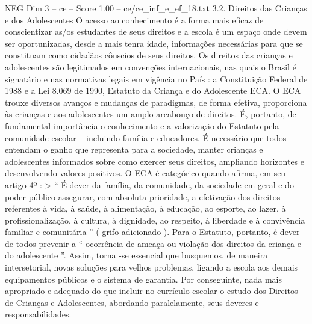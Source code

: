 \begin{textsample}{NEG Dim 3 – ce – Score 1.00 – ce/ce\_inf\_e\_ef\_18.txt}  \label{ex:f3_neg_238}
3.2.
Direitos das Crianças e dos Adolescentes O acesso ao conhecimento é a forma mais eficaz de conscientizar as/os estudantes de seus direitos e a escola é um espaço onde devem ser oportunizadas, desde a mais tenra idade, informações necessárias para que se constituam como cidadãos cônscios de seus direitos.
Os direitos das crianças e adolescentes são legitimados em convenções internacionais, nas quais o Brasil é signatário e nas normativas legais em vigência no País : a Constituição Federal de 1988 e a Lei 8.069 de 1990, Estatuto da Criança e do Adolescente ECA.
O ECA trouxe diversos avanços e mudanças de paradigmas, de forma efetiva, proporciona às crianças e aos adolescentes um amplo arcabouço de direitos.
É, portanto, de fundamental importância o conhecimento e a valorização do Estatuto pela comunidade escolar – incluindo família e educadores.
É necessário que todos entendam o ganho que representa para a sociedade, manter crianças e adolescentes informados sobre como exercer seus direitos, ampliando horizontes e desenvolvendo valores positivos.
O ECA é categórico quando afirma, em seu artigo 4º : > “ É dever da família, da comunidade, da sociedade em geral e do poder público assegurar, com absoluta prioridade, a efetivação dos direitos referentes à vida, à saúde, à alimentação, à educação, ao esporte, ao lazer, à profissionalização, à cultura, à dignidade, ao respeito, à liberdade e à convivência familiar e comunitária ” ( grifo adicionado ).
Para o Estatuto, portanto, é dever de todos prevenir a “ ocorrência de ameaça ou violação dos direitos da criança e do adolescente ”.
Assim, torna -se essencial que busquemos, de maneira intersetorial, novas soluções para velhos problemas, ligando a escola aos demais equipamentos públicos e o sistema de garantia.
Por conseguinte, nada mais apropriado e adequado do que incluir no currículo escolar o estudo dos Direitos de Crianças e Adolescentes, abordando paralelamente, seus deveres e responsabilidades.

\end{textsample}
